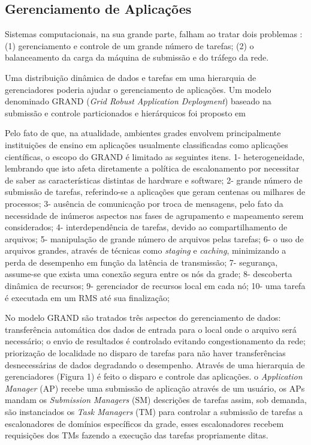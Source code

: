 \subsection{Gerenciamento de Aplicações}

Sistemas computacionais, na sua grande parte, falham ao tratar dois problemas \cite{Mangan2006}: (1) gerenciamento e controle de um grande número de tarefas; (2) o balanceamento da carga da máquina de submissão e do tráfego da rede.

Uma distribuição dinâmica de dados e tarefas em uma hierarquia de gerenciadores poderia ajudar o gerenciamento de aplicações. Um modelo denominado GRAND (\emph{Grid Robust Application Deployment}) baseado na submissão e controle particionados e hierárquicos foi proposto em \cite{Mangan2006}

Pelo fato de que, na atualidade, ambientes grades envolvem principalmente instituições de ensino em aplicações usualmente classificadas como aplicações científicas, o escopo do GRAND é limitado as seguintes itens. 1- heterogeneidade, lembrando que isto afeta diretamente a política de escalonamento por necessitar de saber as características distintas de hardware e software; 2- grande número de submissão de tarefas, referindo-se a aplicações que geram centenas ou milhares de processos; 3- ausência de comunicação por troca de mensagens, pelo fato da necessidade de inúmeros aspectos nas fases de agrupamento e mapeamento serem considerados; 4- interdependência de tarefas, devido ao compartilhamento de arquivos; 5- manipulação de grande número de arquivos pelas tarefas; 6- o uso de arquivos grandes, através de técnicas como \emph{staging} e \emph{caching}, minimizando a perda de desempenho em função da latência de transmissão; 7- segurança, assume-se que exista uma conexão segura entre os nós da grade; 8- descoberta dinâmica de recursos; 9- gerenciador de recursos local em cada nó; 10- uma tarefa é executada em um RMS até sua finalização;

No modelo GRAND são tratados três aspectos do gerenciamento de dados: transferência automática dos dados de entrada para o local onde o arquivo será necessário; o envio de resultados é controlado evitando congestionamento da rede; priorização de localidade no disparo de tarefas para não haver transferências desnecessárias de dados degradando o desempenho. Através de uma hierarquia de gerenciadores (Figura 1) é feito o disparo e controle das aplicações. o \emph{Application Manager} (AP) recebe uma submissão de aplicação através de um usuário, os APs mandam os \emph{Submission Managers} (SM) descrições de tarefas assim, sob demanda, são instanciados os \emph{Task Managers} (TM) para controlar a submissão de tarefas a escalonadores de domínios específicos da grade, esses escalonadores recebem requisições dos TMs fazendo a execução das tarefas propriamente ditas.

